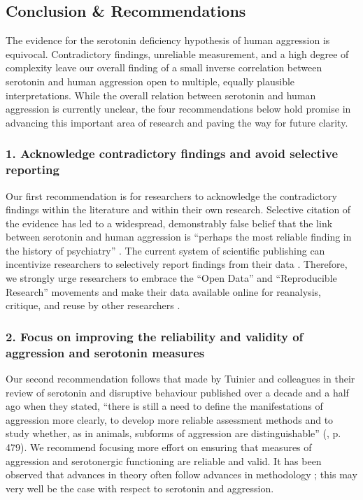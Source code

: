 \subsection{Conclusion \& Recommendations}
The evidence for the serotonin deficiency hypothesis of human aggression is equivocal. Contradictory findings, unreliable measurement, and a high degree of complexity leave our overall finding of a small inverse correlation between serotonin and human aggression open to multiple, equally plausible interpretations. While the overall relation between serotonin and human aggression is currently unclear, the four recommendations below hold promise in advancing this important area of research and paving the way for future clarity. 


\subsubsection{1. Acknowledge contradictory findings and avoid selective reporting}
Our first recommendation is for researchers to acknowledge the contradictory findings within the literature and within their own research. Selective citation of the evidence has led to a widespread, demonstrably false belief that the link between serotonin and human aggression is ``perhaps the most reliable finding in the history of psychiatry'' \parencite[15]{Fishbein2001}. 
The current system of scientific publishing can incentivize researchers to selectively report findings from their data \parencite[see][]{Bones2012, Ioannidis2005, Molloy2011}. Therefore, we strongly urge researchers to embrace the ``Open Data'' and ``Reproducible Research'' movements and make their data available online for reanalysis, critique, and reuse by other researchers \parencite[see][]{Gelman2011a, Molloy2011, Peng2009, Peng2011, Simonsohn2012}. 


\subsubsection{2. Focus on improving the reliability and validity of aggression and serotonin measures}
Our second recommendation follows that made by Tuinier and colleagues in their review of serotonin and disruptive behaviour published over a decade and a half ago when they stated, ``there is still a need to define the manifestations of aggression more clearly, to develop more reliable assessment methods and to study whether, as in animals, subforms of aggression are distinguishable'' (\citeyear{Tuinier96}, p. 479). We recommend focusing more effort on ensuring that measures of aggression and serotonergic functioning are reliable and valid. It has been observed that advances in theory often follow advances in methodology \parencite{Greenwald2012}; this may very well be the case with respect to serotonin and aggression. 


